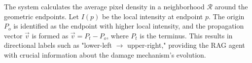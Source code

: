 \begin{sloppypar}
The system calculates the average pixel density in a neighborhood $\mathcal{R}$ around the geometric endpoints. Let $I(p)$ be the local intensity at endpoint $p$. The origin $P_o$ is identified as the endpoint with higher local intensity, and the propagation vector $\vec{v}$ is formed as $\vec{v} = P_t - P_o$, where $P_t$ is the terminus. This results in directional labels such as "lower-left $\rightarrow$ upper-right," providing the RAG agent with crucial information about the damage mechanism's evolution.
\end{sloppypar}
